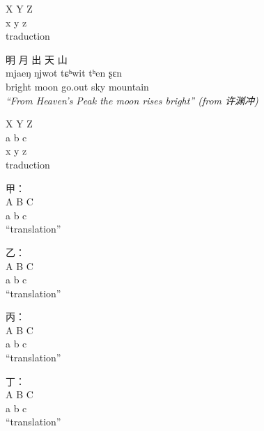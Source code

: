 \documentclass{article}
\newcommand{\ipa}[1]{{\fontspec{Charis SIL}#1}}
\begin{document}
\begin{exe}
  \gll X Y Z\\ %
  x y z\\ %
  \glt traduction %
\end{exe}

\begin{exe}
  \let\eachwordone=\bf
  \let\eachwordtwo=\ipa
  \let\eachwordthree=\textit
  \glll 明 月 出 天 山\\
  mjaeŋ ŋjwot tɕʰwit tʰen ʂɛn\\
  bright moon go.out sky mountain\\
  \glt \textit{``From Heaven's Peak the moon rises bright'' (from 许渊冲)}
\end{exe}

\begin{exe}
  \glll X Y Z\\ %
  a b c\\ %
  x y z\\ %
  \glt traduction %
\end{exe}

\begin{exe}
  \ex
  \glll 甲：\\
  A B C\\
  a b c\\
  \glt ``translation'' %

  \sn
  \glll 乙：\\
  A B C\\
  a b c\\
  \glt ``translation'' %

  \exi{}
  \glll 丙：\\
  A B C\\
  a b c\\
  \glt ``translation'' %

  \ex
  \glll 丁：\\
  A B C\\
  a b c\\
  \glt ``translation'' %
\end{exe}
\end{document}

